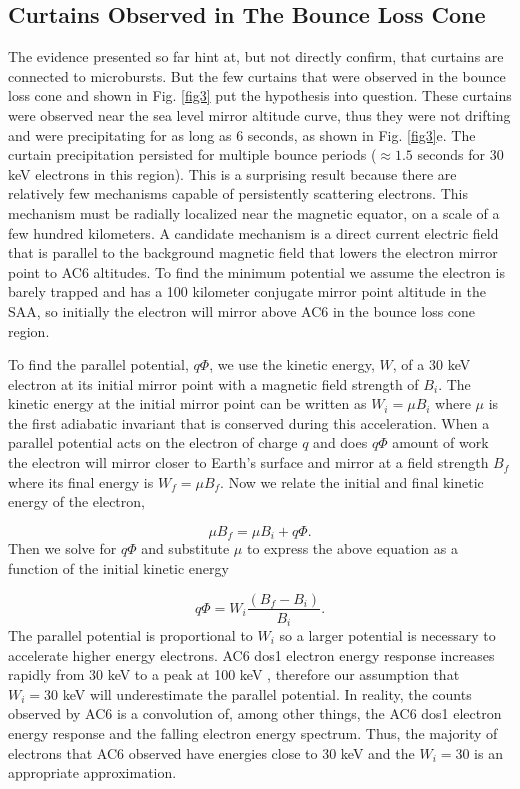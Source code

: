 \documentclass[draft]{agujournal2019}
\begin{document}
\subsection{Curtains Observed in The Bounce Loss Cone}
The evidence presented so far hint at, but not directly confirm, that curtains are connected to microbursts. But the few curtains that were observed in the bounce loss cone and shown in Fig. \ref{fig3} put the hypothesis into question. These curtains were observed near the sea level mirror altitude curve, thus they were not drifting and were precipitating for as long as 6 seconds, as shown in Fig. \ref{fig3}e. The curtain precipitation persisted for multiple bounce periods ($\approx 1.5$ seconds for 30 keV electrons in this region). This is a surprising result because there are relatively few mechanisms capable of persistently scattering electrons. This mechanism must be radially localized near the magnetic equator, on a scale of a few hundred kilometers. A candidate mechanism is a direct current electric field that is parallel to the background magnetic field that lowers the electron mirror point to AC6 altitudes. To find the minimum potential we assume the electron is barely trapped and has a 100 kilometer conjugate mirror point altitude in the SAA, so initially the electron will mirror above AC6 in the bounce loss cone region. 

To find the parallel potential, $q \Phi$,  we use the kinetic energy, $W$, of a $30$ keV electron at its initial mirror point with a magnetic field strength of $B_i$. The kinetic energy at the initial mirror point can be written as $W_i = \mu B_i$ where $\mu$ is the first adiabatic invariant that is conserved during this acceleration. When a parallel potential acts on the electron of charge $q$ and does $q \Phi$ amount of work the electron will mirror closer to Earth's surface and mirror at a field strength $B_f$ where its final energy is $W_f = \mu B_f$. Now we relate the initial and final kinetic energy of the electron,

\begin{equation}
\mu B_f = \mu B_i + q \Phi.
\end{equation} Then we solve for $q \Phi$ and substitute $\mu$ to express the above equation as a function of the initial kinetic energy 

\begin{equation}
 q \Phi = W_i \frac{(B_f - B_i)}{B_i}.
\end{equation} The parallel potential is proportional to $W_i$ so a larger potential is necessary to accelerate higher energy electrons. AC6 dos1 electron energy response increases rapidly from 30 keV to a peak at 100 keV \cite[Figure 2]{O'brien2019}, therefore our assumption that $W_i = 30$ keV will underestimate the parallel potential. In reality, the counts observed by AC6 is a convolution of, among other things, the AC6 dos1 electron energy response and the falling electron energy spectrum. Thus, the majority of electrons that AC6 observed have energies close to 30 keV and the $W_i = 30$ is an appropriate approximation.
\end{document}
